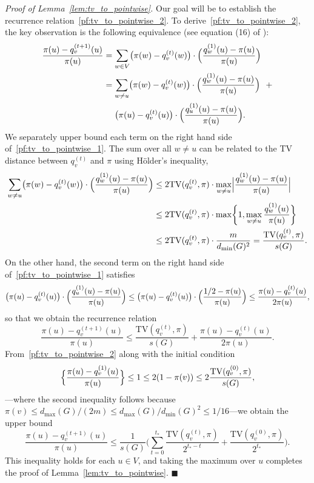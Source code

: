 \documentclass[twoside,11pt]{article}
\newcommand{\1}{\mathbf{1}}
\newcommand{\qed}{\hfill $\blacksquare$}
\begin{document}
\noindent \emph{Proof of Lemma~\ref{lem:tv_to_pointwise}.}
Our goal will be to establish the recurrence relation~\eqref{pf:tv_to_pointwise_2}. 
To derive~\eqref{pf:tv_to_pointwise_2}, the key observation is the following equivalence (see equation (16) of \cite{morris2005}):
\begin{align}
\label{pf:tv_to_pointwise_1}
\frac{\pi(u) - q_v^{(t + 1)}(u)}{\pi(u)} & = \sum_{w \in V} \bigl(\pi(w) - q_v^{(t)}(w) \bigr) \cdot \Bigl(\frac{q_w^{(1)}(u) - \pi(u)}{\pi(u)}\Bigr) \nonumber \\
& = \sum_{w \neq u} \bigl(\pi(w) - q_v^{(t)}(w) \bigr) \cdot \Bigl(\frac{q_w^{(1)}(u) - \pi(u)}{\pi(u)}\Bigr) ~~+ \\
& \quad~\bigl(\pi(u) - q_v^{(t)}(u) \bigr) \cdot \Bigl(\frac{q_u^{(1)}(u) - \pi(u)}{\pi(u)}\Bigr).
\end{align}
We separately upper bound each term on the right hand side of~\eqref{pf:tv_to_pointwise_1}. The sum over all $w \neq u$ can be related to the TV distance between $q_v^{(t)}$ and $\pi$ using H{\"o}lder's inequality,
\begin{align*}
\sum_{w \neq u} \bigl(\pi(w) - q_v^{(t)}(w) \bigr) \cdot \Bigl(\frac{q_w^{(1)}(u) - \pi(u)}{\pi(u)}\Bigr) & \leq 2\mathrm{TV}(q_v^{(t)},\pi) \cdot \max_{w \neq u}\Bigl|\frac{q_w^{(1)}(u) - \pi(u)}{\pi(u)}\Bigr| \\
& \leq 2\mathrm{TV}(q_v^{(t)},\pi) \cdot \max\biggl\{1, \max_{w \neq u} \frac{q_w^{(1)}(u)}{\pi(u)} \biggr\} \\
& \leq 2\mathrm{TV}(q_v^{(t)},\pi) \cdot \frac{m}{d_{\min}(G)^2} = \frac{\mathrm{TV}(q_v^{(t)},\pi) }{s(G)}.
\end{align*}
On the other hand, the second term on the right hand side of~\eqref{pf:tv_to_pointwise_1} satisfies
\begin{align*}
\bigl(\pi(u) - q_v^{(t)}(u) \bigr) \cdot \Bigl(\frac{q_u^{(1)}(u) - \pi(u)}{\pi(u)}\Bigr) \leq \bigl(\pi(u) - q_v^{(t)}(u) \bigr) \cdot \Bigl(\frac{1/2 - \pi(u)}{\pi(u)}\Bigr) \leq \frac{\pi(u) - q_v^{(t)}(u)}{2\pi(u)},
\end{align*}
so that we obtain the recurrence relation
\begin{equation}
\label{pf:tv_to_pointwise_2}
\frac{\pi(u) - q_v^{(t + 1)}(u)}{\pi(u)} \leq \frac{\mathrm{TV}(q_v^{(t)},\pi) }{s(G)} +\frac{\pi(u) - q_v^{(t)}(u)}{2\pi(u)}.
\end{equation}
From~\eqref{pf:tv_to_pointwise_2} along with the initial condition
\begin{equation*}
\Bigl\{\frac{\pi(u) - q_v^{(1)}(u)}{\pi(u)}\Bigr\} \leq 1 \leq 2(1 - \pi(v)) \leq 2\frac{\mathrm{TV}(q_v^{(0)},\pi)}{s(G)},
\end{equation*}
---where the second inequality follows because $\pi(v) \leq d_{\max}(G)/(2m) \leq d_{\max}(G)/d_{\min}(G)^2 \leq 1/16$---we obtain the upper bound
\begin{equation*}
\frac{\pi(u) - q_v^{(t + 1)}(u)}{\pi(u)} \leq \frac{1}{s(G)} \biggl(\sum_{t = 0}^{t_{\ast}} \frac{\mathrm{TV}(q_v^{(t)}, \pi)}{2^{t_{\ast} - t}} + \frac{\mathrm{TV}(q_v^{(0)}, \pi)}{2^{t_{\ast}}}\biggr).
\end{equation*}
This inequality holds for each $u \in V$, and taking the maximum over $u$ completes the proof of Lemma~\ref{lem:tv_to_pointwise}. \qed
\end{document}
